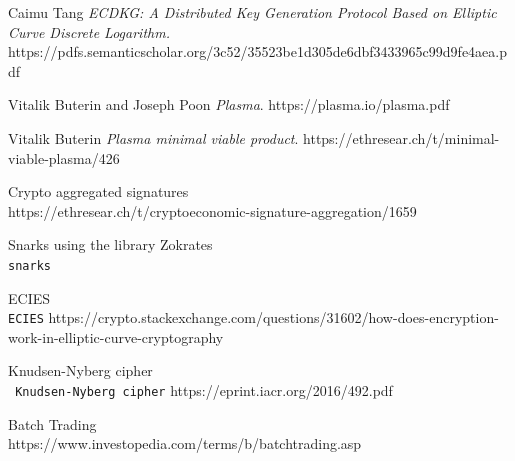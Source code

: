 \documentclass[11pt,parskip=full]{scrartcl}%
\begin{document}
\begin{thebibliography}{9}
Caimu Tang
\textit{ECDKG: A Distributed Key Generation Protocol Based on Elliptic
Curve Discrete Logarithm.}  
https://pdfs.semanticscholar.org/3c52/35523be1d305de6dbf3433965c99d9fe4aea.pdf
 
Vitalik Buterin and Joseph Poon
\textit{Plasma}.
https://plasma.io/plasma.pdf

Vitalik Buterin
\textit{Plasma minimal viable product}.
https://ethresear.ch/t/minimal-viable-plasma/426
 
Crypto aggregated signatures
\\\texttt{}
https://ethresear.ch/t/cryptoeconomic-signature-aggregation/1659

Snarks using the library Zokrates
\\\texttt{snarks}

ECIES
\\\texttt{ECIES}
https://crypto.stackexchange.com/questions/31602/how-does-encryption-work-in-elliptic-curve-cryptography

Knudsen-Nyberg cipher
\\\texttt{ Knudsen-Nyberg cipher}
https://eprint.iacr.org/2016/492.pdf


Batch Trading
\\\texttt{}
https://www.investopedia.com/terms/b/batchtrading.asp

\end{thebibliography}
\end{document}
